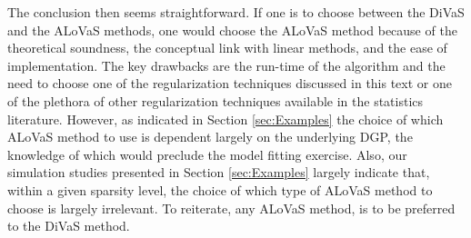 The conclusion then seems straightforward. If one is to choose between the DiVaS and the ALoVaS methods, one would choose the ALoVaS method because of the  theoretical soundness, the conceptual link with linear methods, and the ease of implementation. The key drawbacks are the run-time of the algorithm and the need to choose one of the regularization techniques discussed in this text or one of the plethora of other regularization techniques available in the statistics literature. However, as indicated in Section \ref{sec:Examples}  the choice of which ALoVaS method to use is dependent largely on the underlying DGP, the knowledge of which would preclude the model fitting exercise. Also, our simulation studies presented in Section \ref{sec:Examples} largely indicate that, within a given sparsity level, the choice of which type of ALoVaS method to choose is largely irrelevant. To reiterate, any ALoVaS method, is to be preferred to the DiVaS method. 


